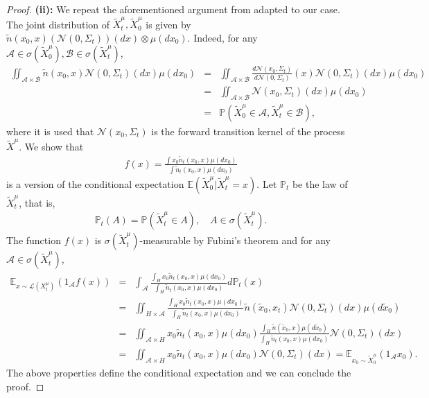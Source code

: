 \documentclass[10pt]{article} %
\newcommand{\E}{\mathbb{E}}
\theoremstyle{plain}
\theoremstyle{definition}
\theoremstyle{remark}
\renewcommand{\P}{{\mathbb P}}
\renewcommand{\L}{\mathscr{L}}
\newcommand{\N}{\mathcal N}
\begin{document}
\begin{proof}
{\bf (ii):} We repeat the aforementioned argument from \citet{pidstrigach2023infinitedimensional} adapted to our case.
The joint distribution of $\widetilde{X}^{\mu}_t, \widetilde{X}^{\mu}_0$ is given by
        $\tilde{n}(x_0, x)(\N(0, \Sigma_t))(dx) \otimes \mu(dx_0)$.
    Indeed, for any ${\mathcal A} \in \sigma(\widetilde{X}^{\mu}_0), {\mathcal B}\in \sigma(\widetilde{X}^{\mu}_t)$,
    \begin{eqnarray*}
        \iint_{{\mathcal A}\times {\mathcal B}} \tilde n(x_0, x) \N(0, \Sigma_t)(dx) \mu(dx_0)
        & = &  \iint_{{\mathcal A}\times {\mathcal B}}  \frac{d \N(x_0, \Sigma_t)}{d \N(0, \Sigma_t)}(x) \N(0, \Sigma_t)(dx) \mu(dx_0) \\
        & = &  \iint_{{\mathcal A}\times {\mathcal B}}  \N(x_0, \Sigma_t)(dx) \mu (dx_0) \\
        & = & \P( \widetilde{X}^{\mu}_0 \in {\mathcal A}, \widetilde{X}^{\mu}_t \in {\mathcal B}),
    \end{eqnarray*}
    where it is used that $\N(x_0, \Sigma_t)$ is the forward transition kernel of the process $\widetilde{X}^{\mu}$.
    We show that
    \begin{eqnarray*}
        f(x) = \frac{\int x_0 \tilde n_t(x_0, x) \mu(dx_0)}{\int \tilde n_t(x_0, x) \mu(dx_0)}
    \end{eqnarray*}
    is a version of the conditional expectation $\E(\widetilde{X}^{\mu}_0 |\widetilde{X}^{\mu}_t = x)$. 
    Let $\P_t$ be the law of $\widetilde{X}^{\mu}_t$, that is, 
    \begin{eqnarray*}
        \P_t(A) = \P(\widetilde{X}_t^{\mu} \in A), \quad A\in \sigma(\widetilde{X}^{\mu}_t).
    \end{eqnarray*}
    The function $f(x)$ is $\sigma(\widetilde{X}^{\mu}_t)$-measurable by Fubini's theorem and for any ${\mathcal A}\in \sigma(\widetilde{X}^{\mu}_t)$,
    \begin{eqnarray*}
        \E_{x \sim \L(X^{\mu}_t)} \left(1_{\mathcal A} f(x)\right) &=& \int_{\mathcal A} \frac{\int_H x_0 \tilde n_t(x_0, x) \mu(dx_0)}{\int_H \tilde n_t(x_0, x) \mu(dx_0)} d \P_t(x) \\
        & = & \iint_{H\times {\mathcal A}} \frac{\int_H x_0 \tilde n_t(x_0, x) \mu(dx_0)}{\int_H \tilde n_t(x_0, x) \mu(dx_0)} \tilde n(\tilde x_0, x_t) \N(0, \Sigma_t)(dx) \mu(d\tilde x_0)\\
        & = & \iint_{{\mathcal A}\times H} x_0 \tilde n_t(x_0, x) \mu(dx_0) \frac{\int_H \tilde n(\tilde x_0, x)  \mu(d\tilde x_0)}{\int_H \tilde n_t(x_0, x) \mu(dx_0)} \N(0, \Sigma_t)(dx)
        \\ & = & \iint_{{\mathcal A}\times H} x_0 \tilde n_t(x_0, x) \mu(dx_0)  \N(0, \Sigma_t)(dx) = \E_{x_0 \sim \widetilde{X}^{\mu}_0}(1_{\mathcal A} x_0).
    \end{eqnarray*}
    The above properties define the conditional expectation and we can conclude the proof.
\end{proof}
\end{document}
